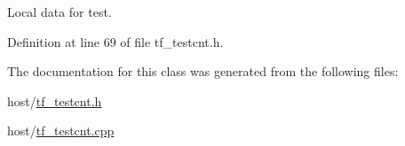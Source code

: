 Local data for test. 

Definition at line 69 of file tf\_\-testcnt.h.

The documentation for this class was generated from the following files:\begin{DoxyCompactItemize}
\item 
host/\hyperlink{tf__testcnt_8h}{tf\_\-testcnt.h}\item 
host/\hyperlink{tf__testcnt_8cpp}{tf\_\-testcnt.cpp}\end{DoxyCompactItemize}
